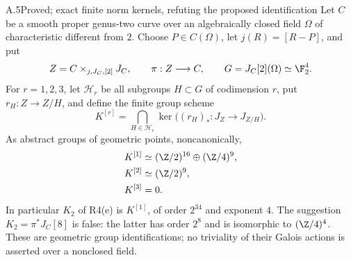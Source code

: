 \begin{claim}{A.5}{Proved; exact finite norm kernels, refuting the proposed identification}
Let $C$ be a smooth proper genus-two curve over an algebraically closed
field $\Omega$ of characteristic different from $2$. Choose $P\in C(\Omega)$,
let $j(R)=[R-P]$, and put
\[
 Z=C\times_{j,J_C,[2]}J_C,\qquad
 \pi:Z\longrightarrow C,\qquad G=J_C[2](\Omega)\simeq\F_2^4.
\]
For $r=1,2,3$, let $\mathcal H_r$ be all subgroups $H\subset G$
of codimension $r$, put $r_H:Z\to Z/H$, and define the finite
group scheme
\[
 K^{[r]}=\bigcap_{H\in\mathcal H_r}
 \ker\bigl((r_H)_*:J_Z\longrightarrow J_{Z/H}\bigr).
\]
As abstract groups of geometric points, noncanonically,
\[
 \begin{split}
 K^{[1]}&\simeq (\Z/2)^{16}\oplus(\Z/4)^9,\\
 K^{[2]}&\simeq (\Z/2)^9,\\
 K^{[3]}&=0.
 \end{split}
\]
In particular $K_2$ of R4(e) is $K^{[1]}$, of order $2^{34}$
and exponent $4$. The suggestion $K_2=\pi^*J_C[8]$ is false:
the latter has order $2^8$ and is isomorphic to $(\Z/4)^4$.
These are geometric group identifications; no triviality of their
Galois actions is asserted over a nonclosed field.
\end{claim}
